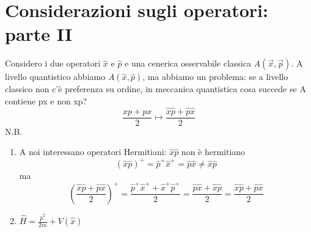 \documentclass[a4paper,11pt]{report}
\theoremstyle{remark}
\theoremstyle{definition}
\newcommand{\x}{\hat{x}}
\newcommand{\p}{\hat{p}}
\begin{document}
\chapter{Considerazioni sugli operatori: parte II}

Considero i due operatori $\hat{x}$ e $\hat{p}$ e una cenerica osservabile classica $A(\vec{x},\vec{p})$. A livello quantistico abbiamo $A(\hat{x},\hat{p})$, ma abbiamo un problema: se a livello classico non c'è preferenza su ordine, in meccanica quantistica cosa succede se A contiene px e non xp?
\begin{equation*}
    \frac{xp + px}{2} \mapsto \frac{\hat{x}\hat{p} + \hat{p}\hat{x}}{2}
\end{equation*}
N.B.
\begin{enumerate}
    \item A noi interessano operatori Hermitiani: $\hat{x}\hat{p}$ non è hermitiano
    \begin{equation*}
        {(\hat{x}\hat{p})}^+ = \p^+\x^+ = \p\x \neq \x\p 
    \end{equation*}
    ma 
    \begin{equation*}
        {\left(\frac{\hat{x}\hat{p} + \hat{p}\hat{x}}{2}\right)}^+ = \frac{\hat{p}^+\hat{x}^+ + \hat{x}^+\hat{p}^+}{2} = \frac{\p\x + \x\p}{2} = \frac{\x\p + \p\x}{2}
    \end{equation*}
    \item $\hat{H} = \frac{\p^2}{2m} + V(\x)$
\end{enumerate}
\end{document}

